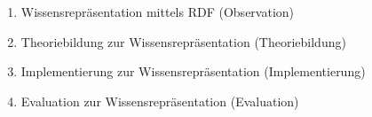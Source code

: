 \begin{enumerate}[label=FZ \arabic*]
\begin{enumerate}[label=\theenumi.\arabic*]
\item Wissensrepräsentation mittels RDF (Observation)
\item Theoriebildung zur Wissensrepräsentation (Theoriebildung)
\item Implementierung zur Wissensrepräsentation (Implementierung)
\item Evaluation zur Wissensrepräsentation (Evaluation)
\end{enumerate}

\end{enumerate}

